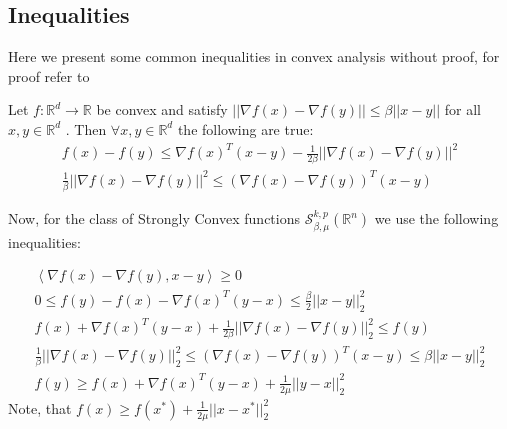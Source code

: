 \subsection{Inequalities}
Here we present some common inequalities in convex analysis without proof, for proof refer to \cite{nesterov}
\begin{lemma}
Let $f : \mathbb{R}^d \rightarrow \mathbb{R}$  be convex and satisfy $|| \nabla f(x) - \nabla f(y) || \leq \beta || x -y ||$ for all $x,y \in \mathbb{R}^d$ . Then $\forall x,y \in \mathbb{R}^d$ the following are true:
\begin{align}
f(x) - f(y) \leq \nabla f(x)^T (x-y) - \frac{1}{2 \beta} || \nabla f(x) - \nabla f(y) ||^2 \\
\frac{1}{\beta} || \nabla f(x) - \nabla f(y) ||^2  \leq( \nabla f(x) - \nabla f(y))^T(x-y)
\end{align}
\end{lemma}
Now, for the class of Strongly Convex functions $\mathcal{S}_{\beta,\mu}^{k,p}(\mathbb{R}^n)$ we use the following inequalities:

\begin{equation}
\begin{aligned}
\left\langle \nabla f(x) -\nabla f(y), x-y \right\rangle \geq 0 \\
 0 \leq f(y) - f(x) -\nabla f(x)^T (y-x) \leq \frac{\beta}{2}||x-y||_2^2 \\
f(x) + \nabla f(x)^T (y-x) + \frac{1}{2\beta}||\nabla f(x)-\nabla f(y)||_2^2 \leq f(y) \\
\frac{1}{\beta}|| \nabla f(x)-\nabla f(y) ||_2^2 \leq(\nabla f(x)-\nabla f(y))^T(x-y) \leq \beta || x -y ||_2^2  \\
f(y) \geq f(x) + \nabla f(x)^T (y-x) + \frac{1}{2\mu}||y-x||_2^2
\end{aligned}
\end{equation}
Note, that $f(x) \geq f(x^*) + \frac{1}{2\mu}||x-x^*||_2^2 $


